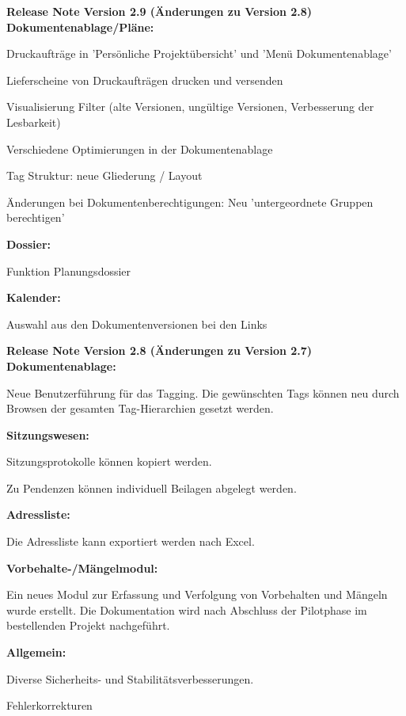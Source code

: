 \textbf{Release Note Version 2.9 (Änderungen zu Version 2.8)} \\
\textbf{Dokumentenablage/Pläne:}
\begin{compactitem}
	\item Druckaufträge in 'Persönliche Projektübersicht' und 'Menü Dokumentenablage' 
	\item Lieferscheine von Druckaufträgen drucken und versenden
	\item Visualisierung Filter (alte Versionen, ungültige Versionen, Verbesserung der Lesbarkeit)
	\item Verschiedene Optimierungen in der Dokumentenablage
	\item Tag Struktur: neue Gliederung / Layout
	\item Änderungen bei Dokumentenberechtigungen: Neu 'untergeordnete Gruppen berechtigen'
\end{compactitem}
\textbf{Dossier:}
\begin{compactitem}
	\item Funktion Planungsdossier 
\end{compactitem}
\textbf{Kalender:}
\begin{compactitem}
	\item Auswahl aus den Dokumentenversionen bei den Links 
\end{compactitem}

\vspace{\baselineskip}

\textbf{Release Note Version 2.8 (Änderungen zu Version 2.7)} \\
\textbf{Dokumentenablage:}
\begin{compactitem}
	\item Neue Benutzerführung für das Tagging. Die gewünschten Tags können neu durch Browsen der gesamten Tag-Hierarchien gesetzt werden.
\end{compactitem}
\textbf{Sitzungswesen:}
\begin{compactitem}
	\item Sitzungsprotokolle können kopiert werden.
	\item Zu Pendenzen können individuell Beilagen abgelegt werden.
\end{compactitem}
\textbf{Adressliste:}
\begin{compactitem}
	\item Die Adressliste kann exportiert werden nach Excel.
\end{compactitem}
\textbf{Vorbehalte-/Mängelmodul:}
\begin{compactitem}
	\item Ein neues Modul zur Erfassung und Verfolgung von Vorbehalten und Mängeln wurde erstellt. Die Dokumentation wird nach Abschluss der Pilotphase im bestellenden Projekt nachgeführt.
\end{compactitem}
\textbf{Allgemein:}
\begin{compactitem}
	\item Diverse Sicherheits- und Stabilitätsverbesserungen.
	\item Fehlerkorrekturen
\end{compactitem}
\vspace{\baselineskip}

